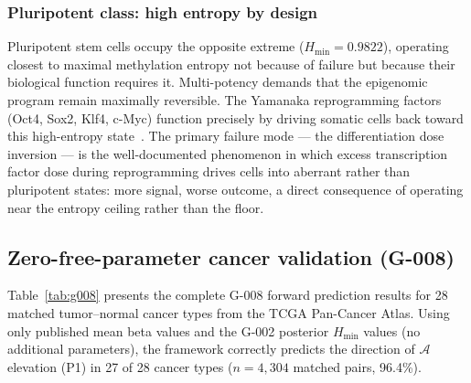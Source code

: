 \documentclass[12pt,a4paper]{article}
\newcommand{\Hmin}{H_{\min}}
\newcommand{\Ascore}{\mathcal{A}}
\begin{document}
\subsubsection{Pluripotent class: high entropy by design}
Pluripotent stem cells occupy the opposite extreme ($\Hmin = 0.9822$),
operating closest to maximal methylation entropy not because of failure
but because their biological function requires it. Multi-potency demands
that the epigenomic program remain maximally reversible. The Yamanaka
reprogramming factors (Oct4, Sox2, Klf4, c-Myc) function precisely by
driving somatic cells back toward this high-entropy state~\cite{Yamanaka2006}.
The primary failure mode --- the differentiation dose inversion --- is the
well-documented phenomenon in which excess transcription factor dose during
reprogramming drives cells into aberrant rather than pluripotent states:
more signal, worse outcome, a direct consequence of operating near the
entropy ceiling rather than the floor.

\subsection{Zero-free-parameter cancer validation (G-008)}
\label{sec:g008results}

Table~\ref{tab:g008} presents the complete G-008 forward prediction results
for 28 matched tumor--normal cancer types from the TCGA Pan-Cancer Atlas.
Using only published mean beta values and the G-002 posterior $\Hmin$ values
(no additional parameters), the framework correctly predicts the direction
of $\Ascore$ elevation (P1) in 27 of 28 cancer types ($n = 4{,}304$
matched pairs, 96.4\%).
\end{document}
